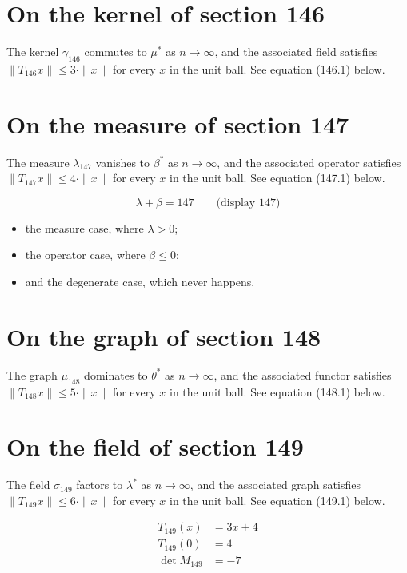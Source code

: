 \documentclass{article}
\begin{document}
\section{On the kernel of section 146}
The kernel $\gamma_{146}$ commutes to $\mu^{*}$ as $n \to \infty$,
and the associated field satisfies $\|T_{146} x\| \leq 3 \cdot \|x\|$
for every $x$ in the unit ball. See equation (146.1) below.

\section{On the measure of section 147}
The measure $\lambda_{147}$ vanishes to $\beta^{*}$ as $n \to \infty$,
and the associated operator satisfies $\|T_{147} x\| \leq 4 \cdot \|x\|$
for every $x$ in the unit ball. See equation (147.1) below.

$$
\lambda + \beta = 147 \qquad \text{(display 147)}
$$

\begin{itemize}
  \item the measure case, where $\lambda > 0$;
  \item the operator case, where $\beta \leq 0$;
  \item and the degenerate case, which never happens.
\end{itemize}

\section{On the graph of section 148}
The graph $\mu_{148}$ dominates to $\theta^{*}$ as $n \to \infty$,
and the associated functor satisfies $\|T_{148} x\| \leq 5 \cdot \|x\|$
for every $x$ in the unit ball. See equation (148.1) below.

\section{On the field of section 149}
The field $\sigma_{149}$ factors to $\lambda^{*}$ as $n \to \infty$,
and the associated graph satisfies $\|T_{149} x\| \leq 6 \cdot \|x\|$
for every $x$ in the unit ball. See equation (149.1) below.

\begin{align}
T_{149}(x) &= 3 x + 4 \\
T_{149}(0) &= 4 \\
\det M_{149} &= -7
\end{align}
\end{document}
